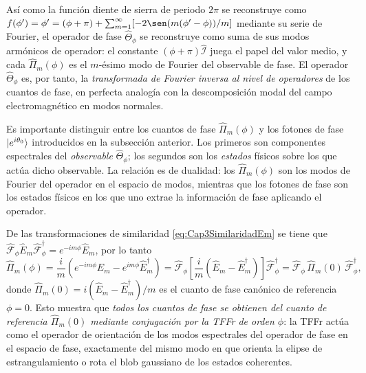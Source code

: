                Así como la función diente de sierra de periodo $2\pi$ se reconstruye como $f(\phi') = \phi' = (\phi+\pi) + \sum_{m=1}^{\infty}[-2\sen(m(\phi'-\phi))/m]$ mediante su serie de Fourier, el operador de fase $\hat{\Theta}_\phi$ se reconstruye como suma de sus modos armónicos de operador: el constante $(\phi+\pi)\hat{\mathcal{I}}$ juega el papel del valor medio, y cada $\hat{\Pi}_m(\phi)$ es el $m$-ésimo modo de Fourier del observable de fase. El operador $\hat{\Theta}_\phi$ es, por tanto, la \textit{transformada de Fourier inversa al nivel de operadores} de los cuantos de fase, en perfecta analogía con la descomposición modal del campo electromagnético en modos normales.

                Es importante distinguir entre los cuantos de fase $\hat{\Pi}_m(\phi)$ y los fotones de fase $\ket{e^{i\theta_0}}$ introducidos en la subsección anterior. Los primeros son componentes espectrales del \textit{observable} $\hat{\Theta}_\phi$; los segundos son los \textit{estados} físicos sobre los que actúa dicho observable. La relación es de dualidad: los $\hat{\Pi}_m(\phi)$ son los modos de Fourier del operador en el espacio de modos, mientras que los fotones de fase son los estados físicos en los que uno extrae la información de fase aplicando el operador.

                De las transformaciones de similaridad \ref{eq:Cap3SimilaridadEm} se tiene que $\hat{\mathcal{F}}_\phi\hat{E}_m\hat{\mathcal{F}}_\phi^\dagger = e^{-im\phi}\hat{E}_m$, por lo tanto
                \begin{equation}\label{eq:Cap3CuantoDeFaseTFFr}
                    \hat{\Pi}_m(\phi) = \frac{i}{m}\left(e^{-im\phi}\hat{E}_m - e^{im\phi}\hat{E}_m^\dagger\right) = \hat{\mathcal{F}}_\phi\left[\frac{i}{m}\left(\hat{E}_m - \hat{E}_m^\dagger\right)\right]\hat{\mathcal{F}}_\phi^\dagger = \hat{\mathcal{F}}_\phi\,\hat{\Pi}_m(0)\,\hat{\mathcal{F}}_\phi^\dagger,
                \end{equation}
                donde $\hat{\Pi}_m(0) = i(\hat{E}_m - \hat{E}_m^\dagger)/m$ es el cuanto de fase canónico de referencia $\phi=0$. Esto muestra que \textit{todos los cuantos de fase se obtienen del cuanto de referencia $\hat{\Pi}_m(0)$ mediante conjugación por la TFFr de orden $\phi$}: la TFFr actúa como el operador de orientación de los modos espectrales del operador de fase en el espacio de fase, exactamente del mismo modo en que orienta la elipse de estrangulamiento o rota el blob gaussiano de los estados coherentes.

